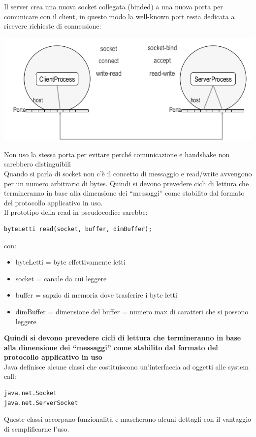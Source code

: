 \documentclass[a4paper,12pt, oneside]{book}
\begin{document}
Il server crea una nuova socket collegata (binded) a una
nuova porta per comunicare con il client, in questo modo la well-known port resta dedicata a ricevere richieste di connessione:
\begin{center}
\includegraphics[scale=3]{img/sc4.png}
\end{center}
Non uso la stessa porta per evitare perché comunicazione e handshake non sarebbero distinguibili\\
Quando si parla di socket non c'è il concetto di messaggio e read/write avvengono per un numero arbitrario di bytes. Quindi si devono prevedere cicli di lettura che
termineranno in base alla dimensione dei “messaggi” come
stabilito dal formato del protocollo applicativo in uso. \\
Il prototipo della read in pseudocodice sarebbe:
\begin{verbatim}
byteLetti read(socket, buffer, dimBuffer);
\end{verbatim}
con:
\begin{itemize}
\item byteLetti = byte effettivamente letti
\item socket = canale da cui leggere
\item buffer = sapzio di memoria dove trasferire i byte letti
\item dimBuffer = dimensione del buffer = numero max di caratteri che si possono leggere
\end{itemize}
\textbf{Quindi si devono prevedere cicli di lettura che
termineranno in base alla dimensione dei “messaggi” come
stabilito dal formato del protocollo applicativo in uso}\\
Java definisce alcune classi che costituiscono un'interfaccia ad oggetti alle system call:
\begin{verbatim}
java.net.Socket
java.net.ServerSocket
\end{verbatim}
Queste classi accorpano funzionalità e mascherano alcuni
dettagli con il vantaggio di semplificarne l'uso.
\end{document}
